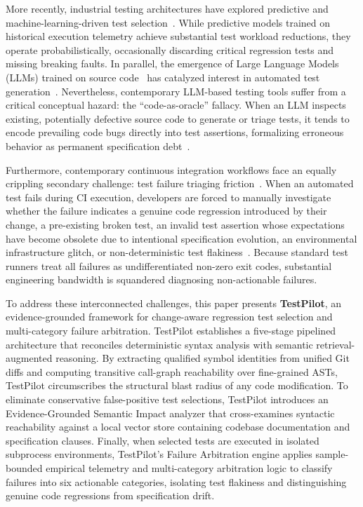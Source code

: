 \documentclass[12pt,onecolumn,draftclsnofoot]{IEEEtran}
\begin{document}
More recently, industrial testing architectures have explored predictive and machine-learning-driven test selection~\cite{machalica2019predictive}. While predictive models trained on historical execution telemetry achieve substantial test workload reductions, they operate probabilistically, occasionally discarding critical regression tests and missing breaking faults. In parallel, the emergence of Large Language Models (LLMs) trained on source code~\cite{chen2021evaluating} has catalyzed interest in automated test generation~\cite{schafer2024empirical,lemieux2023codamosa}. Nevertheless, contemporary LLM-based testing tools suffer from a critical conceptual hazard: the ``code-as-oracle'' fallacy. When an LLM inspects existing, potentially defective source code to generate or triage tests, it tends to encode prevailing code bugs directly into test assertions, formalizing erroneous behavior as permanent specification debt~\cite{schafer2024empirical}.

Furthermore, contemporary continuous integration workflows face an equally crippling secondary challenge: test failure triaging friction~\cite{luo2014empirical,lam2020study}. When an automated test fails during CI execution, developers are forced to manually investigate whether the failure indicates a genuine code regression introduced by their change, a pre-existing broken test, an invalid test assertion whose expectations have become obsolete due to intentional specification evolution, an environmental infrastructure glitch, or non-deterministic test flakiness~\cite{lam2019root}. Because standard test runners treat all failures as undifferentiated non-zero exit codes, substantial engineering bandwidth is squandered diagnosing non-actionable failures.

To address these interconnected challenges, this paper presents \textbf{TestPilot}, an evidence-grounded framework for change-aware regression test selection and multi-category failure arbitration. TestPilot establishes a five-stage pipelined architecture that reconciles deterministic syntax analysis with semantic retrieval-augmented reasoning. By extracting qualified symbol identities from unified Git diffs and computing transitive call-graph reachability over fine-grained ASTs, TestPilot circumscribes the structural blast radius of any code modification. To eliminate conservative false-positive test selections, TestPilot introduces an Evidence-Grounded Semantic Impact analyzer that cross-examines syntactic reachability against a local vector store containing codebase documentation and specification clauses. Finally, when selected tests are executed in isolated subprocess environments, TestPilot's Failure Arbitration engine applies sample-bounded empirical telemetry and multi-category arbitration logic to classify failures into six actionable categories, isolating test flakiness and distinguishing genuine code regressions from specification drift.
\end{document}
